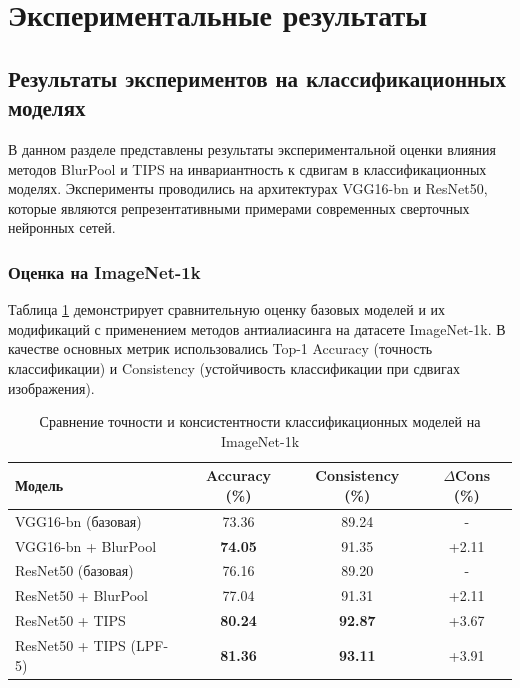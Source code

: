 \section{Экспериментальные результаты}
\label{sec:Chapter4} 

\subsection{Результаты экспериментов на классификационных моделях}
\label{sec:results:classification}

В данном разделе представлены результаты экспериментальной оценки влияния методов BlurPool и TIPS на инвариантность к сдвигам в классификационных моделях. Эксперименты проводились на архитектурах VGG16-bn и ResNet50, которые являются репрезентативными примерами современных сверточных нейронных сетей.

\subsubsection{Оценка на ImageNet-1k}

Таблица \ref{tab:classification_models} демонстрирует сравнительную оценку базовых моделей и их модификаций с применением методов антиалиасинга на датасете ImageNet-1k. В качестве основных метрик использовались Top-1 Accuracy (точность классификации) и Consistency (устойчивость классификации при сдвигах изображения).

\begin{table}[h]
\centering
\caption{Сравнение точности и консистентности классификационных моделей на ImageNet-1k}
\label{tab:classification_models}
\begin{tabular}{lccc}
\toprule
\textbf{Модель} & \textbf{Accuracy (\%)} & \textbf{Consistency (\%)} & \textbf{$\Delta$Cons (\%)} \\
\midrule
VGG16-bn (базовая) & 73.36 & 89.24 & - \\
VGG16-bn + BlurPool & \textbf{74.05} & 91.35 & +2.11 \\
\midrule
ResNet50 (базовая) & 76.16 & 89.20 & - \\
ResNet50 + BlurPool & 77.04 & 91.31 & +2.11 \\
ResNet50 + TIPS & \textbf{80.24} & \textbf{92.87} & +3.67 \\
ResNet50 + TIPS (LPF-5) & \textbf{81.36} & \textbf{93.11} & +3.91 \\
\bottomrule
\end{tabular}
\end{table}

